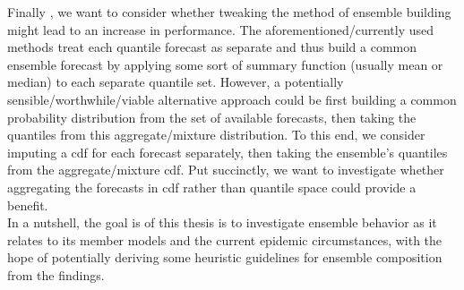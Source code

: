 Finally , we want to consider whether tweaking the method of ensemble building might lead to an increase in performance. The aforementioned/currently used methods treat each quantile forecast as separate and thus build a common ensemble forecast by applying some sort of summary function (usually mean or median) to each separate quantile set. However, a potentially sensible/worthwhile/viable alternative approach could be first building a common probability distribution from the set of available forecasts, then taking the quantiles from this aggregate/mixture distribution. To this end, we consider imputing a \ac{cdf} for each forecast separately, then taking the ensemble's quantiles from the aggregate/mixture \ac{cdf}. Put succinctly, we want to investigate whether aggregating the forecasts in \ac{cdf} rather than quantile space could provide a benefit. \\
In a nutshell, the goal is of this thesis is to investigate ensemble behavior as it relates to its member models and the current epidemic circumstances, with the hope of potentially deriving some heuristic guidelines for ensemble composition from the findings.
\newpage
